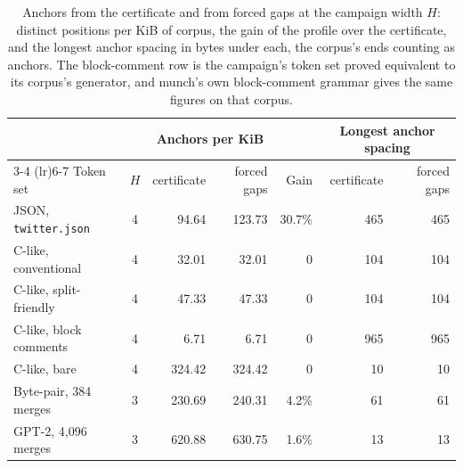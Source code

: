 \documentclass[11pt,a4paper]{article}
\theoremstyle{definition}
\theoremstyle{plain}
\newcommand{\code}[1]{\texttt{#1}}
\begin{document}
\begin{table}
\centering
\caption{Anchors from the certificate and from forced gaps at the campaign width $H$: distinct positions per KiB of
corpus, the gain of the profile over the certificate, and the longest anchor spacing in bytes under each, the corpus's
ends counting as anchors. The block-comment row is the campaign's token set proved equivalent to its corpus's generator,
and munch's own block-comment grammar gives the same figures on that corpus.}
\label{tab:profile}
\setlength{\tabcolsep}{4pt}
\begin{tabular}{lcrrrrr}
\toprule
 & & \multicolumn{2}{c}{Anchors per KiB} & & \multicolumn{2}{c}{Longest anchor spacing} \\
\cmidrule(lr){3-4} \cmidrule(lr){6-7}
Token set & $H$ & certificate & forced gaps & Gain & certificate & forced gaps \\
\midrule
JSON, \code{twitter.json} & 4 & 94.64 & 123.73 & 30.7\% & 465 & 465 \\
C-like, conventional & 4 & 32.01 & 32.01 & 0 & 104 & 104 \\
C-like, split-friendly & 4 & 47.33 & 47.33 & 0 & 104 & 104 \\
C-like, block comments & 4 & 6.71 & 6.71 & 0 & 965 & 965 \\
C-like, bare & 4 & 324.42 & 324.42 & 0 & 10 & 10 \\
Byte-pair, 384 merges & 3 & 230.69 & 240.31 & 4.2\% & 61 & 61 \\
GPT-2, 4{,}096 merges & 3 & 620.88 & 630.75 & 1.6\% & 13 & 13 \\
\bottomrule
\end{tabular}
\end{table}
\end{document}
